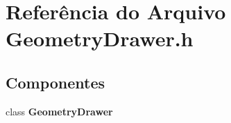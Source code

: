 \section{Referência do Arquivo Geometry\+Drawer.\+h}
\label{_geometry_drawer_8h}
\subsection*{Componentes}
\begin{DoxyCompactItemize}
\item 
class {\bf Geometry\+Drawer}
\end{DoxyCompactItemize}
